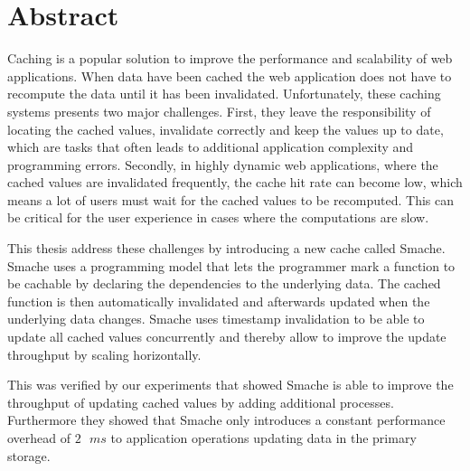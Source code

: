 \chapter{Abstract}

Caching is a popular solution to improve the performance and scalability of web applications. When data have been cached the web application does not have to recompute the data until it has been invalidated. Unfortunately, these caching systems presents two major challenges. First, they leave the responsibility of locating the cached values, invalidate correctly and keep the values up to date, which are tasks that often leads to additional application complexity and programming errors. Secondly, in highly dynamic web applications, where the cached values are invalidated frequently, the cache hit rate can become low, which means a lot of users must wait for the cached values to be recomputed. This can be critical for the user experience in cases where the computations are slow.

This thesis address these challenges by introducing a new cache called Smache. Smache uses a programming model that lets the programmer mark a function to be cachable by declaring the dependencies to the underlying data. The cached function is then automatically invalidated and afterwards updated when the underlying data changes. Smache uses timestamp invalidation to be able to update all cached values concurrently and thereby allow to improve the update throughput by scaling horizontally.

This was verified by our experiments that showed Smache is able to improve the throughput of updating cached values by adding additional processes. Furthermore they showed that Smache only introduces a constant performance overhead of $2\text{ }ms$ to application operations updating data in the primary storage.

